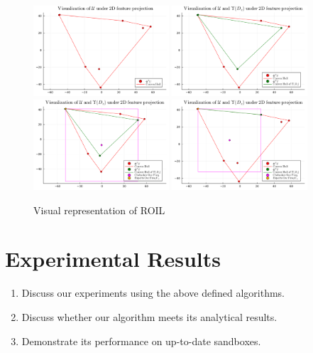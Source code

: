 \documentclass[11pt]{uai2023}
\begin{document}
\begin{figure}[htbp]
	\centering
	\includegraphics[width=0.45\textwidth]{../notebooks/plots/visual_U.pdf}
	\includegraphics[width=0.45\textwidth]{../notebooks/plots/visual_U_and_Upsilon.pdf}
	\includegraphics[width=0.45\textwidth]{../notebooks/plots/visual_solve_cheb.pdf}
	\includegraphics[width=0.45\textwidth]{../notebooks/plots/visual_solve_cheb_outside_upsilon.pdf}
	\caption{Visual representation of ROIL}
	\label{fig:visual_representation_of_ROIL}
\end{figure}

\section{Experimental Results}
\label{sec:experimental-results}
\begin{enumerate}
	\item Discuss our experiments using the above defined algorithms.
	\item Discuss whether our algorithm meets its analytical results.
	\item Demonstrate its performance on up-to-date sandboxes.
\end{enumerate}
\end{document}
